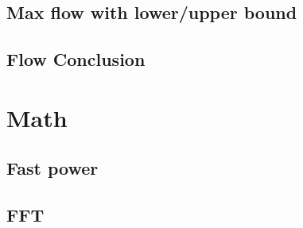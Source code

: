\documentclass[a4paper,10pt,twocolumn,oneside]{article}
\begin{document}
%

\subsection{Max flow with lower/upper bound}


% 

%

\subsection{Flow Conclusion}


\section{Math}

\subsection{Fast power}


\subsection{FFT}


%

%
\end{document}
